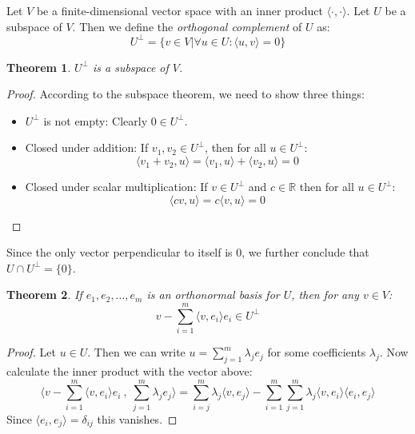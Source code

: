 \documentclass[12pt, a4paper]{article}
\newtheorem{theorem}{Theorem}[section]
\numberwithin{equation}{section}
\begin{document}
Let $V$ be a finite-dimensional vector space with an inner product $\langle\cdot,\cdot\rangle$. Let $U$ be a subspace of $V$. Then we define the \textit{orthogonal complement} of $U$ as:
\begin{equation}
U^\perp=\{v\in V|\forall u\in U: \langle u, v\rangle = 0\}
\end{equation}
\begin{theorem}
$U^\perp$ is a subspace of $V$.
\end{theorem}
\begin{proof}
According to the subspace theorem, we need to show three things:
\begin{itemize}
\item $U^\perp$ is not empty: Clearly $0\in U^\perp$.
\item Closed under addition: If $v_1,v_2\in U^\perp$, then for all $u\in U^\perp$:
\begin{equation}
\langle v_1+v_2,u\rangle=\langle v_1,u\rangle + \langle v_2,u\rangle = 0 
\end{equation}
\item Closed under scalar multiplication: If $v\in U^\perp$ and $c\in\mathbb{R}$ then for all $u\in U^\perp$:
\begin{equation}
\langle cv,u\rangle = c\langle v,u\rangle = 0
\end{equation}
\end{itemize}
\end{proof}

Since the only vector perpendicular to itself is $0$, we further conclude that $U\cap U^\perp=\{0\}$.

\begin{theorem}
If $e_1, e_2,\ldots,e_m$ is an orthonormal basis for $U$, then for any $v\in V$:
\begin{equation}
v-\sum_{i=1}^m\langle v,e_i\rangle e_i\in U^\perp
\end{equation}
\end{theorem}
\begin{proof}
Let $u\in U$. Then we can write $u=\sum_{j=1}^m\lambda_j e_j$ for some coefficients $\lambda_j$. Now calculate the inner product with the vector above:
\begin{equation}
\langle v-\sum_{i=1}^m\langle v,e_i\rangle e_i\ ,\ \sum_{j=1}^m\lambda_j e_j\rangle=\sum_{i=j}^m\lambda_j\langle v,e_j\rangle-\sum_{i=1}^m\sum_{j=1}^m\lambda_j\langle v,e_i\rangle\langle e_i,e_j\rangle
\end{equation}
Since $\langle e_i,e_j\rangle=\delta_{ij}$ this vanishes.
\end{proof}
\end{document}
